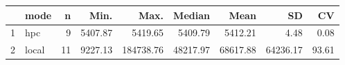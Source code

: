 \begin{table}[ht]
\centering
\begin{tabular}{rlrrrrrrr}
  \hline
 & mode & n & Min. & Max. & Median & Mean & SD & CV \\ 
  \hline
1 & hpc &   9 & 5407.87 & 5419.65 & 5409.79 & 5412.21 & 4.48 & 0.08 \\ 
  2 & local &  11 & 9227.13 & 184738.76 & 48217.97 & 68617.88 & 64236.17 & 93.61 \\ 
   \hline
\end{tabular}
\end{table}
